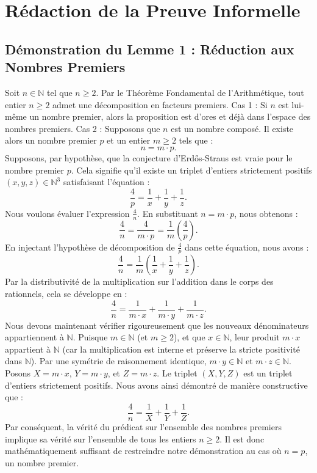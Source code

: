\documentclass[12pt, a4paper]{article}
\begin{document}
\newpage

\section{Rédaction de la Preuve Informelle}

\subsection{Démonstration du Lemme 1 : Réduction aux Nombres Premiers}
Soit $n \in \mathbb{N}$ tel que $n \ge 2$. Par le Théorème Fondamental de l'Arithmétique, tout entier $n \ge 2$ admet une décomposition en facteurs premiers.
Cas 1 : Si $n$ est lui-même un nombre premier, alors la proposition est d'ores et déjà dans l'espace des nombres premiers.
Cas 2 : Supposons que $n$ est un nombre composé. Il existe alors un nombre premier $p$ et un entier $m \ge 2$ tels que :
\begin{equation}
n = m \cdot p.
\end{equation}
Supposons, par hypothèse, que la conjecture d'Erd\H{o}s-Straus est vraie pour le nombre premier $p$. Cela signifie qu'il existe un triplet d'entiers strictement positifs $(x, y, z) \in \mathbb{N}^3$ satisfaisant l'équation :
\begin{equation}
\frac{4}{p} = \frac{1}{x} + \frac{1}{y} + \frac{1}{z}.
\end{equation}
Nous voulons évaluer l'expression $\frac{4}{n}$. En substituant $n = m \cdot p$, nous obtenons :
\begin{equation}
\frac{4}{n} = \frac{4}{m \cdot p} = \frac{1}{m} \left( \frac{4}{p} \right).
\end{equation}
En injectant l'hypothèse de décomposition de $\frac{4}{p}$ dans cette équation, nous avons :
\begin{equation}
\frac{4}{n} = \frac{1}{m} \left( \frac{1}{x} + \frac{1}{y} + \frac{1}{z} \right).
\end{equation}
Par la distributivité de la multiplication sur l'addition dans le corps des rationnels, cela se développe en :
\begin{equation}
\frac{4}{n} = \frac{1}{m \cdot x} + \frac{1}{m \cdot y} + \frac{1}{m \cdot z}.
\end{equation}
Nous devons maintenant vérifier rigoureusement que les nouveaux dénominateurs appartiennent à $\mathbb{N}$.
Puisque $m \in \mathbb{N}$ (et $m \ge 2$), et que $x \in \mathbb{N}$, leur produit $m \cdot x$ appartient à $\mathbb{N}$ (car la multiplication est interne et préserve la stricte positivité dans $\mathbb{N}$).
Par une symétrie de raisonnement identique, $m \cdot y \in \mathbb{N}$ et $m \cdot z \in \mathbb{N}$.
Posons $X = m \cdot x$, $Y = m \cdot y$, et $Z = m \cdot z$. Le triplet $(X, Y, Z)$ est un triplet d'entiers strictement positifs.
Nous avons ainsi démontré de manière constructive que :
\begin{equation}
\frac{4}{n} = \frac{1}{X} + \frac{1}{Y} + \frac{1}{Z}.
\end{equation}
Par conséquent, la vérité du prédicat sur l'ensemble des nombres premiers implique sa vérité sur l'ensemble de tous les entiers $n \ge 2$. Il est donc mathématiquement suffisant de restreindre notre démonstration au cas où $n = p$, un nombre premier.
\end{document}
